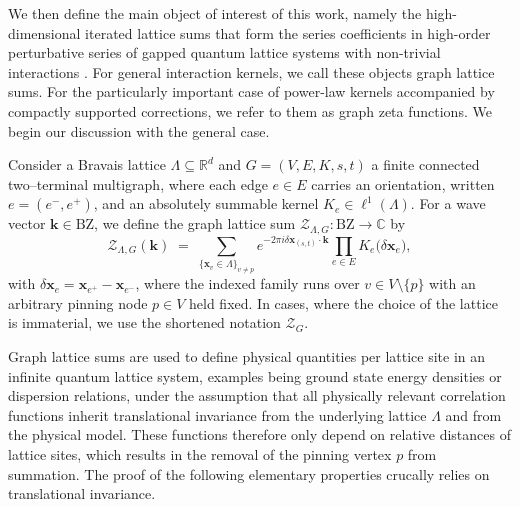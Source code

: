 \documentclass[]{amsart}
\numberwithin{mythm}{section}
\begin{document}
We then define the main object of interest of this work, namely the high-dimensional iterated lattice sums that form the series coefficients in high-order perturbative series of gapped quantum lattice systems with non-trivial interactions \cite{adelhardt2025quantum,fey2019quantum,adelhardt2024monte}. For general interaction kernels, we call these objects graph lattice sums. For the particularly important case of power-law kernels accompanied by compactly supported corrections, we refer to them as graph zeta functions. We begin our discussion with the general case. 

\begin{definition}
\label{def:graph-lattice-sum}
Consider a Bravais lattice $\Lambda\subseteq\mathds R^d$ and $G=(V,E,K,s,t)$ a finite connected two--terminal multigraph, where each edge $e\in E$ carries an orientation, written $e=(e^-,e^+)$, and an absolutely summable kernel $K_e\in\ell^1(\Lambda)$. For a wave vector $\bm k\in \mathrm{BZ}$, we define the graph lattice sum ${\mathcal Z}_{\Lambda,G}:\mathrm{BZ}\to\mathds C$ by
\[
{\mathcal Z}_{\Lambda,G}(\bm k)
\;=\;\sum_{\{\bm x_{v}\in\Lambda\}_{v\neq p}}
e^{-2\pi i\delta\bm x_{(s,t)}\cdot\bm k}
\prod_{e\in E}
{K}_{e}\big(\delta\bm x_e\big),
\]
with $\delta\bm x_e=\bm x_{e^+}-\bm x_{e^-}$, where the indexed family runs over $v\in V\setminus\{p\}$ with an arbitrary pinning
node $p\in V$ held fixed. In cases, where the choice of the lattice is immaterial, we use the shortened notation $\mathcal Z_G$.
\end{definition}
Graph lattice sums are used to define physical quantities per lattice site in an infinite quantum lattice system, examples being ground state energy densities or dispersion relations, under the assumption that all physically relevant correlation functions inherit translational invariance from the underlying lattice $\Lambda$ and from the physical model. These functions therefore only depend on relative distances of lattice sites, which results in the removal of the pinning vertex $p$ from summation. The proof of the following elementary properties crucally relies on translational invariance. 
\end{document}
